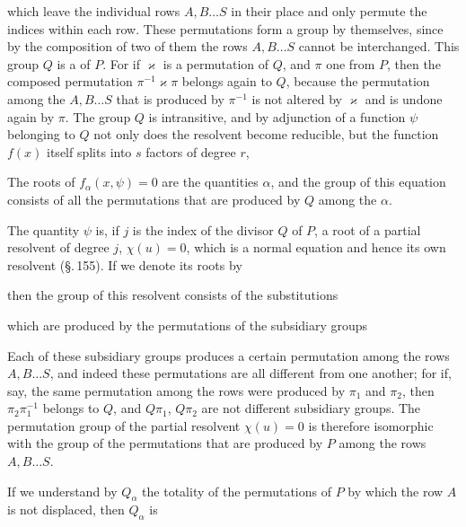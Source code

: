 
which leave the individual rows $A, B \dots S$ in their
place and only permute the indices within each row. These
permutations form a group by themselves, since by the
composition of two of them the rows $A, B \dots
S$ cannot be interchanged. This group $Q$ is a
 of $P$. For if $\varkappa$ is a permutation of
$Q$, and $\pi$ one from $P$, then the composed
permutation $\pi^{-1} \varkappa \pi$ belongs again to $Q$, because the
permutation among the $A, B \dots S$ that is produced by $\pi^{-1}$
is not altered by $\varkappa$ and is undone again by
$\pi$. The group $Q$ is
intransitive, and by adjunction of a function $\psi$ belonging
to $Q$ not only does the  resolvent
become reducible, but the function $f(x)$ itself splits into $s$
factors of degree $r$,


The roots of $f_\alpha(x,\psi) = 0$ are the quantities $\alpha$,
and the  group of this equation consists of all the
permutations that are produced by $Q$ among the $\alpha$.

The quantity $\psi$ is, if $j$ is the index of the divisor $Q$ of
$P$, a root of a partial resolvent of degree $j$,
$\chi(u) = 0$, which is a normal equation and hence its
own  resolvent (\S.\,155). If we denote
its roots by


then the  group of this resolvent consists of the
substitutions


which are produced by the permutations of the subsidiary groups


Each of these subsidiary groups produces a certain
permutation among the rows $A, B \dots S$, and
indeed these permutations are all different from one another;
for if, say, the same permutation among the rows were produced
by $\pi_1$ and $\pi_2$, then $\pi_2 \pi_1^{-1}$ belongs
to $Q$, and $Q\pi_1$, $Q\pi_2$ are not different
subsidiary groups. The permutation group of the partial resolvent
$\chi(u) = 0$ is therefore isomorphic with the group of the
permutations that are produced by $P$ among the rows $A, B \dots S$.

If we understand by $Q_\alpha$ the totality of the permutations
of $P$ by which the row $A$ is not displaced, then
$Q_\alpha$ is

